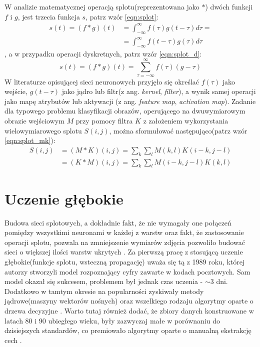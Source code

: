 W analizie matematycznej operacją splotu(reprezentowana jako $*$) dwóch funkcji $f$ i $g$, jest trzecia funkcja $s$, patrz wzór \ref{eqn:splot}:
\begin{equation}
\begin{split}
s(t) = (f * g)(t) & = \int_{-\infty}^{\infty}f(\tau)g(t-\tau)d\tau =\\
& =\int_{-\infty}^{\infty}f(t-\tau)g(\tau)d\tau
\end{split}
\label{eqn:splot}
\end{equation}
, a w przypadku operacji dyskretnych, patrz wzór \ref{eqn:splot_d}:
\begin{equation}
s(t)=(f*g)(t)=\sum_{\tau = -\infty}^{\infty}f(\tau)(g-\tau)
\label{eqn:splot_d}
\end{equation}
W literaturze opisującej sieci neuronowych przyjęło się określać $f(\tau)$ jako wejście, $g(t - \tau)$ jako jądro lub filtr(z ang. \textit{kernel}, \textit{filter}), a wynik samej operacji jako mapę atrybutów lub aktywacji (z ang. \textit{feature map}, \textit{activation map})\cite{piczak}. Zadanie dla typowego problemu klasyfikacji obrazów, operującego na dwuwymiarowym obrazie wejściowym $M$ przy pomocy filtra $K$ z założeniem wykorzystania wielowymiarowego splotu $S(i, j)$, można sformułować następująco(patrz wzór \ref{eqn:splot_mk}):
\begin{equation}
\begin{split}
S(i, j) & = (M*K)(i,j)=\sum_{k}^{}\sum_{l}^{}M(k,l)K(i-k,j-l) \\
& = (K*M)(i,j)=\sum_{k}^{}\sum_{l}^{}M(i-k,j-l)K(k,l)
\end{split}
\label{eqn:splot_mk}
\end{equation}

\section{Uczenie głębokie}

Budowa sieci splotowych, a dokładnie fakt, że nie wymagały one połączeń pomiędzy wszystkimi neuronami w każdej z warstw oraz fakt, że zastosowanie operacji splotu, pozwala na zmniejszenie wymiarów zdjęcia pozwoliło budować sieci o większej ilości warstw ukrytych \cite{python_ml}. Za pierwszą pracę z stosującą uczenie głębokie(funkcje splotu, wsteczną propagację) uważa się tą z 1989 roku, której autorzy stworzyli model rozpoznający cyfry zawarte w kodach pocztowych\cite{lecun}. Sam model okazał się sukcesem, problemem był jednak czas uczenia - $\sim$3 dni. Dodatkowo w tamtym okresie na popularności zyskiwały metody jądrowe(maszyny wektorów nośnych) oraz wszelkiego rodzaju algorytmy oparte o drzewa decyzyjne \cite{hands_on}. Warto tutaj również dodać, że zbiory danych konstruowane w latach 80 i 90 ubiegłego wieku, były zazwyczaj małe w porównaniu do dzisiejszych standardów, co premiowało algorytmy oparte o manualną ekstrakcję cech \cite{deep}. \\


